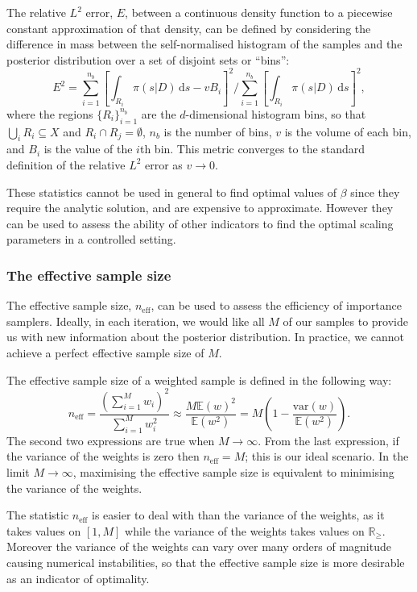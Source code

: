 \documentclass[final]{siamltex}
\newcommand{\neff}{n_{\text{eff}}}
\newcommand{\E}{{\mathbb E}}
\begin{document}
The relative $L^2$ error, $E$, between a continuous density function to a
piecewise constant approximation of that density, can be defined by considering the
difference in mass between the self-normalised histogram of the
samples and the posterior distribution over a set of disjoint sets or
``bins'':
\begin{equation}\label{eqn:L2_error}
	E^2 = \sum\limits_{i=1}^{n_b}\left[\displaystyle\int_{R_i} \! \pi(s|D) \, \mbox{d}s - vB_i\right]^2 \Big/ \sum\limits_{i=1}^{n_b}\left[\displaystyle\int_{R_i} \! \pi(s|D) \, \mbox{d}s\right]^2,
\end{equation}
where the regions $\{R_i\}_{i=1}^{n_b}$ are the $d$-dimensional
histogram bins, so that $\bigcup_i R_i \subseteq X$ and
$R_i\cap R_j=\emptyset$, $n_b$ is the number of bins, $v$ is the
volume of each bin, and $B_i$ is the value of the $i$th bin. This
metric converges to the standard definition of the relative $L^2$
error as $v\rightarrow 0$.

These statistics cannot be used in general to find optimal values of
$\beta$ since they require the analytic solution, and are expensive to
approximate. However they can be used to assess the ability of other
indicators to find the optimal scaling parameters in a controlled
setting.


\subsubsection{The effective sample size}\label{sec:ess}

The effective sample size, $\neff$, can be used to assess the
efficiency of importance samplers. Ideally, in each iteration, we
would like all $M$ of our samples to provide us with new information
about the posterior distribution. In practice, we cannot achieve a
perfect effective sample size of $M$.

The effective sample size of a weighted sample is defined in the
following way:
\[
	\neff = \frac{\left(\sum_{i=1}^M \! w_i\right)^2}{\sum_{i=1}^M \! w_i^2} \approx \frac{M\E(w)^2}{\E(w^2)} = M\left(1 - \frac{\mbox{var}(w)}{\mathbb{E}(w^2)}\right).
\]
The second two expressions are true when $M\rightarrow\infty$. From
the last expression, if the variance of the weights is zero then
$\neff = M$; this is our ideal scenario. In the limit
$M\rightarrow\infty$, maximising the effective
sample size is equivalent to minimising the variance of the weights.

The statistic $\neff$ is easier to deal with than the variance of the
weights, as it takes values on $[1, M]$ while the variance of the
weights takes values on $\mathbb{R}_\geq$. Moreover the variance of
the weights can vary
over many orders of magnitude causing numerical instabilities, so that the effective
sample size is more desirable as an indicator of optimality.
\end{document}

